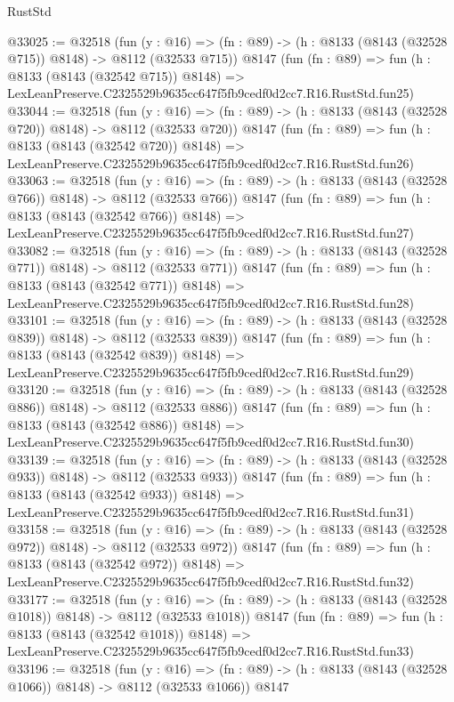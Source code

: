\begin{lexlean}{RustStd}
\begin{coremodule}
@33025 := @32518
    (fun (y : @16) => (fn : @89) -> (h : @8133 (@8143 (@32528 @715)) @8148) -> @8112 (@32533 @715))
    @8147
    (fun (fn : @89) =>
    fun (h : @8133 (@8143 (@32542 @715)) @8148) =>
    LexLeanPreserve.C2325529b9635cc647f5fb9cedf0d2cc7.R16.RustStd.fun25)
@33044 := @32518
    (fun (y : @16) => (fn : @89) -> (h : @8133 (@8143 (@32528 @720)) @8148) -> @8112 (@32533 @720))
    @8147
    (fun (fn : @89) =>
    fun (h : @8133 (@8143 (@32542 @720)) @8148) =>
    LexLeanPreserve.C2325529b9635cc647f5fb9cedf0d2cc7.R16.RustStd.fun26)
@33063 := @32518
    (fun (y : @16) => (fn : @89) -> (h : @8133 (@8143 (@32528 @766)) @8148) -> @8112 (@32533 @766))
    @8147
    (fun (fn : @89) =>
    fun (h : @8133 (@8143 (@32542 @766)) @8148) =>
    LexLeanPreserve.C2325529b9635cc647f5fb9cedf0d2cc7.R16.RustStd.fun27)
@33082 := @32518
    (fun (y : @16) => (fn : @89) -> (h : @8133 (@8143 (@32528 @771)) @8148) -> @8112 (@32533 @771))
    @8147
    (fun (fn : @89) =>
    fun (h : @8133 (@8143 (@32542 @771)) @8148) =>
    LexLeanPreserve.C2325529b9635cc647f5fb9cedf0d2cc7.R16.RustStd.fun28)
@33101 := @32518
    (fun (y : @16) => (fn : @89) -> (h : @8133 (@8143 (@32528 @839)) @8148) -> @8112 (@32533 @839))
    @8147
    (fun (fn : @89) =>
    fun (h : @8133 (@8143 (@32542 @839)) @8148) =>
    LexLeanPreserve.C2325529b9635cc647f5fb9cedf0d2cc7.R16.RustStd.fun29)
@33120 := @32518
    (fun (y : @16) => (fn : @89) -> (h : @8133 (@8143 (@32528 @886)) @8148) -> @8112 (@32533 @886))
    @8147
    (fun (fn : @89) =>
    fun (h : @8133 (@8143 (@32542 @886)) @8148) =>
    LexLeanPreserve.C2325529b9635cc647f5fb9cedf0d2cc7.R16.RustStd.fun30)
@33139 := @32518
    (fun (y : @16) => (fn : @89) -> (h : @8133 (@8143 (@32528 @933)) @8148) -> @8112 (@32533 @933))
    @8147
    (fun (fn : @89) =>
    fun (h : @8133 (@8143 (@32542 @933)) @8148) =>
    LexLeanPreserve.C2325529b9635cc647f5fb9cedf0d2cc7.R16.RustStd.fun31)
@33158 := @32518
    (fun (y : @16) => (fn : @89) -> (h : @8133 (@8143 (@32528 @972)) @8148) -> @8112 (@32533 @972))
    @8147
    (fun (fn : @89) =>
    fun (h : @8133 (@8143 (@32542 @972)) @8148) =>
    LexLeanPreserve.C2325529b9635cc647f5fb9cedf0d2cc7.R16.RustStd.fun32)
@33177 := @32518
    (fun (y : @16) =>
    (fn : @89) -> (h : @8133 (@8143 (@32528 @1018)) @8148) -> @8112 (@32533 @1018))
    @8147
    (fun (fn : @89) =>
    fun (h : @8133 (@8143 (@32542 @1018)) @8148) =>
    LexLeanPreserve.C2325529b9635cc647f5fb9cedf0d2cc7.R16.RustStd.fun33)
@33196 := @32518
    (fun (y : @16) =>
    (fn : @89) -> (h : @8133 (@8143 (@32528 @1066)) @8148) -> @8112 (@32533 @1066))
    @8147

\end{coremodule}
\end{lexlean}
